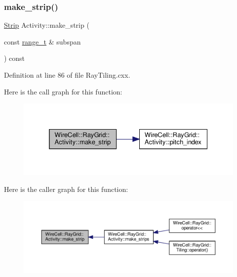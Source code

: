 \subsubsection{\texorpdfstring{make\+\_\+strip()}{make\_strip()}}
{\footnotesize\ttfamily \hyperlink{struct_wire_cell_1_1_ray_grid_1_1_strip}{Strip} Activity\+::make\+\_\+strip (\begin{DoxyParamCaption}\item[{const \hyperlink{class_wire_cell_1_1_ray_grid_1_1_activity_af70e5851ae6fb8d76415033c0f90cb3e}{range\+\_\+t} \&}]{subspan }\end{DoxyParamCaption}) const}



Definition at line 86 of file Ray\+Tiling.\+cxx.

Here is the call graph for this function\+:
\nopagebreak
\begin{figure}[H]
\begin{center}
\leavevmode
\includegraphics[width=325pt]{class_wire_cell_1_1_ray_grid_1_1_activity_a08432ca0d7411ba1c990e2e53b46975d_cgraph}
\end{center}
\end{figure}
Here is the caller graph for this function\+:
\nopagebreak
\begin{figure}[H]
\begin{center}
\leavevmode
\includegraphics[width=350pt]{class_wire_cell_1_1_ray_grid_1_1_activity_a08432ca0d7411ba1c990e2e53b46975d_icgraph}
\end{center}
\end{figure}
\mbox{\label{class_wire_cell_1_1_ray_grid_1_1_activity_a4319dbeecdffdfe805f768530e0cbe9f}} 
